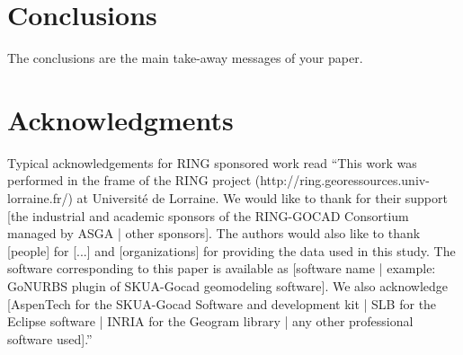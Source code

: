 \documentclass[final]{ring}
\begin{document}
\section*{Conclusions}

The conclusions are the main take-away messages of your paper. 

\section*{Acknowledgments}

Typical acknowledgements for RING sponsored work read ``This work was performed
in the frame of the RING project (http://ring.georessources.univ-lorraine.fr/)
at Université de Lorraine. We would like to thank for their support [the
industrial and academic sponsors of the RING-GOCAD Consortium managed by ASGA |
other sponsors]. The authors would also like to thank [people] for [...] and
[organizations] for providing the data used in this study. The software
corresponding to this paper is available as [software name | example: GoNURBS
plugin of SKUA-Gocad geomodeling software]. We also acknowledge [AspenTech for the SKUA-Gocad Software and development kit | SLB for the Eclipse software | INRIA for the Geogram library | any other professional software used].''


\end{document}

